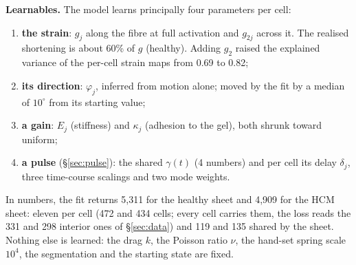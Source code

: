 \documentclass[10pt]{article}
\begin{document}
\textbf{Learnables.} The model learns principally four parameters per cell:
\begin{enumerate}[leftmargin=1.6em,itemsep=1pt]
\item \textbf{the strain}: $g_j$ along the fibre at full activation and $g_{2j}$ across it. The realised
shortening is about 60\% of $g$ (healthy). Adding $g_2$ raised the explained variance of the per-cell strain
maps from 0.69 to 0.82;
\item \textbf{its direction}: $\varphi_j$, inferred from motion alone; moved by the fit by a median of
$10^\circ$ from its starting value;
\item \textbf{a gain}: $E_j$ (stiffness) and $\kappa_j$ (adhesion to the gel), both shrunk toward uniform;
\item \textbf{a pulse} (\S\ref{sec:pulse}): the shared $\gamma(t)$ (4 numbers) and per cell its delay $\delta_j$, three
time-course scalings and two mode weights.
\end{enumerate}
In numbers, the fit returns 5,311 for the healthy sheet and 4,909 for the HCM sheet: eleven per cell (472 and 434
cells; every cell carries them, the loss reads the 331 and 298 interior ones of \S\ref{sec:data}) and 119 and 135
shared by the sheet. Nothing else is learned: the drag $k$, the Poisson ratio $\nu$, the hand-set spring scale
$10^4$, the segmentation and the starting state are fixed.
\end{document}
